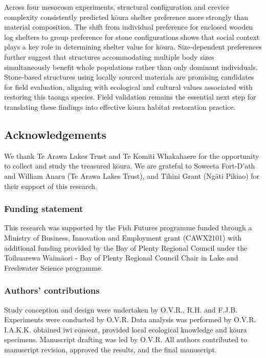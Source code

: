 \documentclass[
  letterpaper,
  DIV=11,
  numbers=noendperiod]{scrartcl}
\begin{document}
Across four mesocosm experiments, structural configuration and crevice
complexity consistently predicted kōura shelter preference more strongly
than material composition. The shift from individual preference for
enclosed wooden log shelters to group preference for stone
configurations shows that social context plays a key role in determining
shelter value for kōura. Size-dependent preferences further suggest that
structures accommodating multiple body sizes simultaneously benefit
whole populations rather than only dominant individuals. Stone-based
structures using locally sourced materials are promising candidates for
field evaluation, aligning with ecological and cultural values
associated with restoring this taonga species. Field validation remains
the essential next step for translating these findings into effective
kōura habitat restoration practice.

\subsection{Acknowledgements}\label{acknowledgements}

We thank Te Arawa Lakes Trust and Te Komiti Whakahaere for the
opportunity to collect and study the treasured kōura. We are grateful to
Soweeta Fort-D'ath and William Anaru (Te Arawa Lakes Trust), and Tihini
Grant (Ngāti Pikiao) for their support of this research.

\subsubsection{Funding statement}\label{funding-statement}

This research was supported by the Fish Futures programme funded through
a Ministry of Business, Innovation and Employment grant (CAWX2101) with
additional funding provided by the Bay of Plenty Regional Council under
the Toihuarewa Waimāori - Bay of Plenty Regional Council Chair in Lake
and Freshwater Science programme.

\subsubsection{Authors' contributions}\label{authors-contributions}

Study conception and design were undertaken by O.V.R., R.H. and F.J.B.
Experiments were conducted by O.V.R. Data analysis was performed by
O.V.R. I.A.K.K. obtained iwi consent, provided local ecological
knowledge and kōura specimens. Manuscript drafting was led by O.V.R. All
authors contributed to manuscript revision, approved the results, and
the final manuscript.
\end{document}
